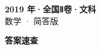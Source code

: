 \documentclass[zihao=-4, a4paper]{ctexart}
\begin{document}
\begin{center}
  {\Large\bfseries 2019 年·全国Ⅱ卷·文科}\\[4pt]
  {\large 数学 · 简答版}
\end{center}
\medskip
{}

\clearpage
{}
\begin{center}{\Large\bfseries 答案速查}\end{center}
\medskip

\end{document}
